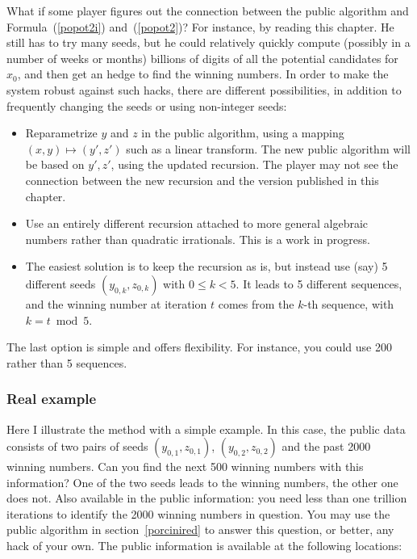 \documentclass[oneside,10pt]{book}
\begin{document}
What if some player figures out the connection between the public algorithm and Formula~(\ref{popot2i}) and~(\ref{popot2})? For instance, by reading this chapter. He still has to try many seeds, but he could relatively quickly compute (possibly in a number of weeks or months) billions of digits of all the potential candidates for $x_0$, and then get an hedge to find the winning numbers.
In order to make the system robust against such hacks,  there are different possibilities, in addition to frequently changing the seeds or using non-integer seeds: \vspace{1ex}
\begin{itemize}
\item Reparametrize $y$ and $z$ in the public algorithm, using a mapping $(x, y) \mapsto (y',z')$
 such as a linear transform. The new public algorithm will be  based on $y', z'$, using the updated recursion. The player may not see the connection between the new recursion and the version published in this chapter.
\item Use an entirely different recursion attached to more general algebraic numbers rather than quadratic irrationals. This is a work in progress.
\item The easiest solution is to keep the recursion as is, but instead use (say) 5 different seeds $(y_{0,k},z_{0,k})$ with
$0\leq k < 5$. It leads to 5 different sequences, and the winning number at iteration $t$ comes from the $k$-th
 sequence, with $k = t \bmod 5$.
\end{itemize}\vspace{1ex}
The last option is simple and offers flexibility. For instance, you could use 200 rather than 5 sequences.

\subsubsection{Real example}

Here I illustrate the method with a simple example. In this case, the public data consists of two pairs of seeds
 $(y_{0,1}, z_{0,1})$, $(y_{0,2}, z_{0,2})$ and the past 2000 winning numbers. Can you find the next 500 winning numbers with this information? One of the two seeds leads to the winning numbers, the other one does not. Also available in the public information: you need less than one trillion iterations to identify the 2000 winning numbers in question.
You may use the
 public algorithm in section~\ref{porcinired} to answer this question, or better, any hack of your own. The
 public information is available at the following locations: \vspace{1ex}
\end{document}

